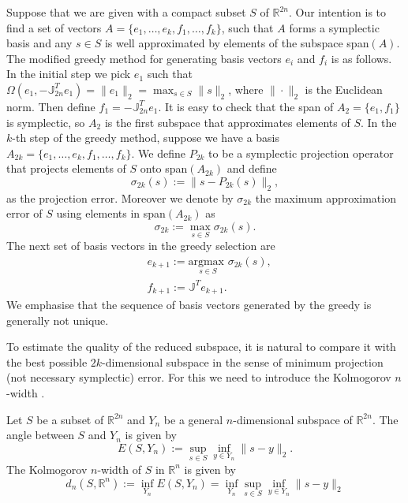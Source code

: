 Suppose that we are given with a compact subset $S$ of $\mathbb R^{2n}$. Our intention is to find a set of vectors $A=\{e_1,\dots,e_k,f_1,\dots,f_k\}$, such that $A$ forms a symplectic basis and any $s\in S$ is well approximated by elements of the subspace span$(A)$. The modified greedy method for generating basis vectors $e_i$ and $f_i$ is as follows. In the initial step we pick $e_1$ such that $\Omega(e_1,-\mathbb{J}_{2n}^T e_1) = \|e_1\|_2 = \max_{s\in S} \|s\|_2$, where $\|\cdot\|_2$ is the Euclidean norm. Then define $f_1 = -\mathbb{J}_{2n}^T e_1$. It is easy to check that the span of $A_2 = \{e_1,f_1\}$ is symplectic, so $A_2$ is the first subspace that approximates elements of $S$. In the $k$-th step of the greedy method, suppose we have a basis $A_{2k} = \{ e_1,\dots, e_k , f_1,\dots ,f_k \}$. We define $P_{2k}$ to be a symplectic projection operator that projects elements of $S$ onto span$(A_{2k})$ and define
\begin{equation} \label{eq:new1}
	\sigma_{2k}(s) := \|s-P_{2k}(s)\|_2,
\end{equation}
as the projection error. Moreover we denote by $\sigma_{2k}$ the maximum approximation error of $S$ using elements in span$(A_{2k})$ as
\begin{equation} \label{eq:new2}
	\sigma_{2k} := \max_{s\in S} \sigma_{2k}(s).
\end{equation}
The next set of basis vectors in the greedy selection are
\begin{equation} \label{eq:new3}
\begin{aligned}
	& e_{k+1} := \underset{s\in S}{\text{argmax }}\sigma_{2k}(s), \\
	& f_{k+1} := \mathbb{J}^T e_{k+1}.
\end{aligned}
\end{equation}
We emphasise that the sequence of basis vectors generated by the greedy is generally not unique. 

To estimate the quality of the reduced subspace, it is natural to compare it with the best possible $2k$-dimensional subspace in the sense of minimum projection (not necessary symplectic) error. For this we need to introduce the Kolmogorov $n$-width \cite{Kolmogoroff:1936fj,Pinkus:1985vy}.

\begin{definition}
Let $S$ be a subset of $\mathbb R^{2n}$ and $Y_n$ be a general $n$-dimensional subspace of $\mathbb R^{2n}$. The angle between $S$ and $Y_n$ is given by
\begin{equation} \label{eq:new4}
	E(S,Y_n) := \sup_{s\in S} \inf_{y\in Y_n} \|s-y\|_2.
\end{equation}
The Kolmogorov $n$-width of $S$ in $\mathbb R^n$ is given by
\begin{equation} \label{eq:new5}
	d_{n}(S,\mathbb{R}^n) := \inf_{Y_n} E(S,Y_n) = \inf_{Y_n} \sup_{s\in S} \inf_{y\in Y_n} \|s-y\|_2
\end{equation}
\end{definition}


